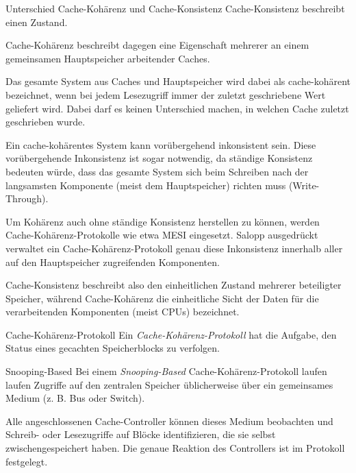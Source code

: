 \begin{bonus}{Unterschied Cache-Kohärenz und Cache-Konsistenz}
    Cache-Konsistenz beschreibt einen Zustand.

    Cache-Kohärenz beschreibt dagegen eine Eigenschaft mehrerer an einem gemeinsamen Hauptspeicher arbeitender Caches.

    Das gesamte System aus Caches und Hauptspeicher wird dabei als cache-kohärent bezeichnet, wenn bei jedem Lesezugriff immer der zuletzt geschriebene Wert geliefert wird.
    Dabei darf es keinen Unterschied machen, in welchen Cache zuletzt geschrieben wurde.

    Ein cache-kohärentes System kann vorübergehend inkonsistent sein.
    Diese vorübergehende Inkonsistenz ist sogar notwendig, da ständige Konsistenz bedeuten würde, dass das gesamte System sich beim Schreiben nach der langsamsten Komponente (meist dem Hauptspeicher) richten muss (Write-Through).

    Um Kohärenz auch ohne ständige Konsistenz herstellen zu können, werden Cache-Kohärenz-Protokolle wie etwa MESI eingesetzt.
    Salopp ausgedrückt verwaltet ein Cache-Kohärenz-Protokoll genau diese Inkonsistenz innerhalb aller auf den Hauptspeicher zugreifenden Komponenten.

    Cache-Konsistenz beschreibt also den einheitlichen Zustand mehrerer beteiligter Speicher, während Cache-Kohärenz die einheitliche Sicht der Daten für die verarbeitenden Komponenten (meist CPUs) bezeichnet.
\end{bonus}

\begin{defi}{Cache-Kohärenz-Protokoll}
    Ein \emph{Cache-Kohärenz-Protokoll} hat die Aufgabe, den Status eines gecachten Speicherblocks zu verfolgen.
\end{defi}

\begin{defi}{Snooping-Based}
    Bei einem \emph{Snooping-Based} Cache-Kohärenz-Protokoll laufen laufen Zugriffe auf den zentralen Speicher üblicherweise über ein gemeinsames Medium (z. B. Bus oder Switch).

    Alle angeschlossenen Cache-Controller können dieses Medium beobachten und Schreib- oder Lesezugriffe auf Blöcke identifizieren, die sie selbst zwischengespeichert haben.
    Die genaue Reaktion des Controllers ist im Protokoll festgelegt.
\end{defi}

